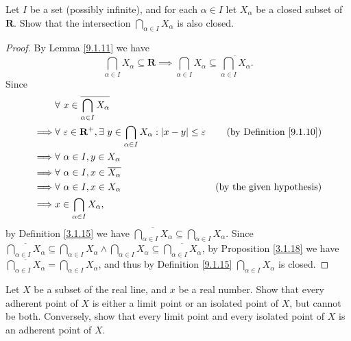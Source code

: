 \begin{exercise}\label{ex 9.1.8}
    Let \(I\) be a set (possibly infinite), and for each \(\alpha \in I\) let \(X_{\alpha}\) be a closed subset of \(\mathbf{R}\).
    Show that the intersection \(\bigcap_{\alpha \in I} X_{\alpha}\) is also closed.
\end{exercise}

\begin{proof}
    By Lemma \ref{9.1.11} we have
    \[
        \bigcap_{\alpha \in I} X_{\alpha} \subseteq \mathbf{R} \implies \bigcap_{\alpha \in I} X_{\alpha} \subseteq \overline{\bigcap_{\alpha \in I} X_{\alpha}}.
    \]
    Since
    \begin{align*}
                 & \forall\ x \in \overline{\bigcap_{\alpha \in I} X_{\alpha}}                                                                                                   \\
        \implies & \forall\ \varepsilon \in \mathbf{R}^+, \exists\ y \in \bigcap_{\alpha \in I} X_{\alpha} : \abs*{x - y} \leq \varepsilon & \text{(by Definition \ref{9.1.10})} \\
        \implies & \forall\ \alpha \in I, y \in X_{\alpha}                                                                                                                       \\
        \implies & \forall\ \alpha \in I, x \in \overline{X_{\alpha}}                                                                                                            \\
        \implies & \forall\ \alpha \in I, x \in X_{\alpha}                                                                                 & \text{(by the given hypothesis)}    \\
        \implies & x \in \bigcap_{\alpha \in I} X_{\alpha},
    \end{align*}
    by Definition \ref{3.1.15} we have \(\overline{\bigcap_{\alpha \in I} X_{\alpha}} \subseteq \bigcap_{\alpha \in I} X_{\alpha}\).
    Since \(\overline{\bigcap_{\alpha \in I} X_{\alpha}} \subseteq \bigcap_{\alpha \in I} X_{\alpha} \land \bigcap_{\alpha \in I} X_{\alpha} \subseteq \overline{\bigcap_{\alpha \in I} X_{\alpha}}\), by Proposition \ref{3.1.18} we have \(\overline{\bigcap_{\alpha \in I} X_{\alpha}} = \bigcap_{\alpha \in I} X_{\alpha}\), and thus by Definition \ref{9.1.15} \(\bigcap_{\alpha \in I} X_{\alpha}\) is closed.
\end{proof}

\begin{exercise}\label{ex 9.1.9}
    Let \(X\) be a subset of the real line, and \(x\) be a real number.
    Show that every adherent point of \(X\) is either a limit point or an isolated point of \(X\), but cannot be both.
    Conversely, show that every limit point and every isolated point of \(X\) is an adherent point of \(X\).
\end{exercise}

